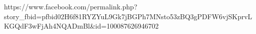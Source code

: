 
 
 
 
 

https://www.facebook.com/permalink.php?story_fbid=pfbid02H6f81RYZYuL9Gk7jBGPh7MNsto53zBQ3gPDFW6vjSKprvLKGQdF3wFjAh4NQADmBl&id=100087626946702
